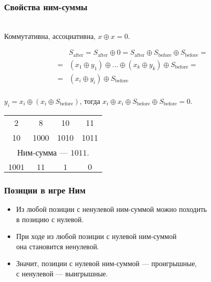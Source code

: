 \begin{frame} \frametitle{Свойства ним-суммы} \ \\ [-0.4cm]
	Коммутативна, ассоциативна, $x \oplus x = 0$. \vspace{-0.8cm}
\renewcommand{\sb}{S_{\text{before}}}
\newcommand{\sa}{S_{\text{after}}}

\begin{align*}
&	\sa = \sa \oplus 0 = \sa \oplus \sb \oplus \sb = \\
= &	(x_1 \oplus y_1) \oplus \ldots \oplus (x_k \oplus y_k) \oplus \sb = \\
= & (x_i \oplus y_i) \oplus \sb \\
\end{align*} \vspace{-1.3cm} \pause

$y_i = x_i \oplus (x_i \oplus \sb)$, тогда $x_i \oplus x_i \oplus \sb \oplus \sb = 0$. \pause

\begin{center}\begin{tabular}{cccc}
2 & 8 & 10 & 11 \\
{\small 10} & {\small 1000} & {\small 1010} & {\small 1011} \\
\multicolumn{4}{c}{Ним-сумма — $1011$.} \\ \pause
\phantom{ававав} & \phantom{ававав} & \phantom{ававав} & \phantom{ававав} \\
{\small $1001$} & {\small $11$} & {\small $1$} & {\small $0$} \\
\end{tabular} \end{center}
\end{frame}

\begin{frame} \frametitle{Позиции в игре Ним}
\begin{itemize} \itemsep=5mm
	\item Из любой позиции с ненулевой ним-суммой можно походить \\
	в позицию с нулевой.
	\item При ходе из любой позиции с нулевой ним-суммой \\
	она становится ненулевой.
	\item Значит, позиции с нулевой ним-суммой — проигрышные, \\
	с ненулевой — выигрышные.
\end{itemize}
\end{frame}
